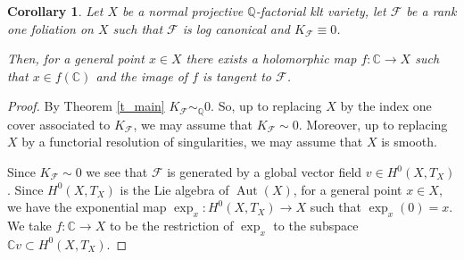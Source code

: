\documentclass[12pt]{amsart}
\newtheorem{corollary}[theorem]{Corollary}
\DeclareMathOperator{\Aut}{Aut}
\begin{document}
\begin{corollary}
\label{cor_hyperbolicity}
Let $X$ be a normal projective $\mathbb Q$-factorial klt variety, let $\mathcal F$ be a rank one foliation on $X$ such that $\mathcal F$ is log canonical and  
$K_{\mathcal F}\equiv 0$.

Then, for a general point $x \in X$ there exists a holomorphic map $f\colon \mathbb C \to X$ such that 
$x \in f(\mathbb C)$ and the image of $f$ is tangent to $\mathcal F$.
\end{corollary}
\begin{proof}
By Theorem \ref{t_main} $K_{\mathcal F}\sim_{\mathbb Q} 0$.  So, up to replacing $X$ by the index one cover associated to $K_{\mathcal F}$, we may assume that $K_{\mathcal F} \sim 0$.
Moreover, up to replacing $X$ by a functorial resolution of singularities, we may assume that $X$ is smooth.

Since $K_{\mathcal F} \sim 0$ we see that  $\mathcal F$ is generated by a global vector field $v \in H^0(X, T_X)$.  Since $H^0(X, T_X)$ is the Lie algebra of $\Aut (X)$, 
for a general point $x \in X$, we have the exponential map $\exp_x\colon H^0(X, T_X) \to X$ such
that $\exp_x(0) = x$.  We take $f\colon \mathbb C \to X$ to be the restriction of $\exp_x$ to the subspace $\mathbb Cv \subset H^0(X, T_X)$. 
\end{proof}









\end{document}

